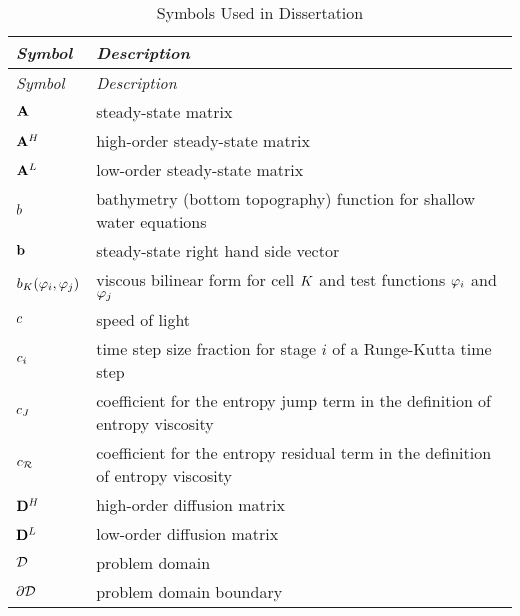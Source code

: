 \begin{center}
\begin{longtable}{l p{4.8in}}
\caption{Symbols Used in Dissertation\label{tab:symbols}}\\
\hline
\emph{Symbol} & \emph{Description}\\
\hline
\endfirsthead
\hline
\emph{Symbol} & \emph{Description}\\
\hline
\endhead
\hline
\endfoot
\hline
\endlastfoot
$\mathbf{A}$        & steady-state matrix\\
$\mathbf{A}^H$ & high-order steady-state matrix\\
$\mathbf{A}^L$ & low-order steady-state matrix\\
$b$      & bathymetry (bottom topography) function for shallow
                     water equations\\
$\mathbf{b}$           & steady-state right hand side vector\\
$b_K(\varphi_i,\varphi_j)$ &
                     viscous bilinear form for cell $K$ and test
                     functions $\varphi_i$ and $\varphi_j$\\

$c$    & speed of light\\
$c_i$    & time step size fraction for stage $i$ of a
                     Runge-Kutta time step\\
$c_J$ & coefficient for the entropy jump term in the definition
                     of entropy viscosity\\
$c_{\mathcal{R}}$ & coefficient for the entropy residual term in the
                         definition of entropy viscosity\\

$\mathbf{D}^H$ & high-order diffusion matrix\\
$\mathbf{D}^L$ & low-order diffusion matrix\\
$\mathcal{D}$          & problem domain\\
$\partial\mathcal{D}$  & problem domain boundary\\


\end{longtable}
\end{center}
